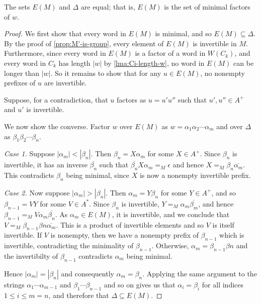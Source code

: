 \documentclass[noindex,noinsetproof,emphthm,12pt]{lmaths}
\begin{document}
\begin{prop}
	The sets $E(M)$ and $\Delta$ are equal; that is, $E(M)$ is the set of minimal factors of $w$. \incomplete
\end{prop}
\begin{proof}
	We first show that every word in $E(M)$ is minimal, and so $E(M) \subseteq \Delta$. By the proof of \cref{prop:M'-is-group}, every element of $E(M)$ is invertible in $M$. Furthermore, since every word in $E(M)$ is a factor of a word in $W(C_k)$, and every word in $C_k$ has length $|w|$ by \cref{lma:Ci-length-w}, no word in $E(M)$ can be longer than $|w|$. So it remains to show that for any $u \in E(M)$, no nonempty prefixes of $u$ are invertible.

	Suppose, for a contradiction, that $u$ factors as $u = u'u''$ such that $u', u'' \in A^+$ and $u'$ is invertible.

	We now show the converse. Factor $w$ over $E(M)$ as $w = \alpha_1 \alpha_2 \cdots \alpha_m$ and over $\Delta$ as $\beta_1 \beta_2 \cdots \beta_n$.

	\emph{Case 1.} Suppose $|\alpha_m| < |\beta_n|$. Then $\beta_n = X\alpha_m$ for some $X \in A^+$. Since $\beta_n$ is invertible, it has an inverse $\overline{\beta_n}$ such that $\overline{\beta_n}X\alpha_m =_M \epsilon$ and hence $X =_M \beta_n\overline{\alpha_m}$. This contradicts $\beta_n$ being minimal, since $X$ is now a nonempty invertible prefix.

	\emph{Case 2.} Now suppose $|\alpha_m| > |\beta_n|$. Then $\alpha_m = Y\beta_n$ for some $Y \in A^+$, and so $\beta_{n-1} = VY$ for some $V \in A^*$. Since $\beta_n$ is invertible, $Y =_M \alpha_m\overline{\beta_m}$, and hence $\beta_{n-1} =_M V\alpha_m\overline{\beta_n}$. As $\alpha_m \in E(M)$, it is invertible, and we conclude that $V =_M \beta_{n-1}\beta{n}\overline{\alpha_m}$. This is a product of invertible elements and so $V$ is itself invertible. If $V$ is nonempty, then we have a nonempty prefix of $\beta_{n-1}$ which is invertible, contradicting the minimality of $\beta_{n-1}$. Otherwise, $\alpha_m = \beta_{n-1}\beta{n}$ and the invertibilty of $\beta_{n-1}$ contradicts $\alpha_m$ being minimal.

	Hence $|\alpha_m| = |\beta_n|$ and consequently $\alpha_m = \beta_n$. Applying the same argument to the strings $\alpha_1 \cdots \alpha_{m-1}$ and $\beta_1 \cdots \beta_{n-1}$ and so on gives us that $\alpha_i = \beta_i$ for all indices $1 \le i \le m = n$, and therefore that $\Delta \subseteq E(M)$.
\end{proof}
\end{document}
